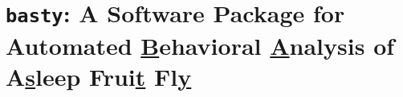 \chapter{
  \texorpdfstring{
	  \texttt{basty}: A Software Package for Automated \underline{B}ehavioral \underline{A}nalysis of A\underline{s}leep Frui\underline{t} Fl\underline{y}
  }{
	  basty: A Software Package for Automated Behavioral Analysis of Asleep Fruit Fly
  }
 }
